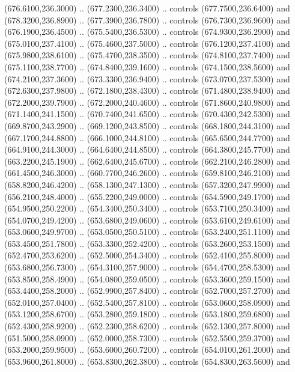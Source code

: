 {\begin{scope}[y=0.80pt, x=0.80pt, yscale=-1, xscale=1, inner sep=0pt, outer sep=0pt, #1]
      (676.6100,236.3000) .. (677.2300,236.3400) .. controls (677.7500,236.6400) and
      (678.3200,236.8900) .. (677.3900,236.7800) .. controls (676.7300,236.9600) and
      (676.1900,236.4500) .. (675.5400,236.5300) .. controls (674.9300,236.2900) and
      (675.0100,237.4100) .. (675.4600,237.5000) .. controls (676.1200,237.4100) and
      (675.9800,238.6100) .. (675.4700,238.3500) .. controls (674.8100,237.7400) and
      (675.1100,238.7700) .. (674.8400,239.1600) .. controls (674.1500,238.5600) and
      (674.2100,237.3600) .. (673.3300,236.9400) .. controls (673.0700,237.5300) and
      (672.6300,237.9800) .. (672.1800,238.4300) .. controls (671.4800,238.9400) and
      (672.2000,239.7900) .. (672.2000,240.4600) .. controls (671.8600,240.9800) and
      (671.1400,241.1500) .. (670.7400,241.6500) .. controls (670.4300,242.5300) and
      (669.8700,243.2900) .. (669.1200,243.8500) .. controls (668.1800,244.3100) and
      (667.1700,244.8800) .. (666.1000,244.8100) .. controls (665.6500,244.7700) and
      (664.9100,244.3000) .. (664.6400,244.8500) .. controls (664.3800,245.7700) and
      (663.2200,245.1900) .. (662.6400,245.6700) .. controls (662.2100,246.2800) and
      (661.4500,246.3000) .. (660.7700,246.2600) .. controls (659.8100,246.2100) and
      (658.8200,246.4200) .. (658.1300,247.1300) .. controls (657.3200,247.9900) and
      (656.2100,248.4000) .. (655.2200,249.0000) .. controls (654.5900,249.1700) and
      (654.9500,250.2200) .. (654.3400,250.3400) .. controls (653.7100,250.3400) and
      (654.0700,249.4200) .. (653.6800,249.0600) .. controls (653.6100,249.6100) and
      (653.0600,249.9700) .. (653.0500,250.5100) .. controls (653.2400,251.1100) and
      (653.4500,251.7800) .. (653.3300,252.4200) .. controls (653.2600,253.1500) and
      (652.4700,253.6200) .. (652.5000,254.3400) .. controls (652.4100,255.8000) and
      (653.6800,256.7300) .. (654.3100,257.9000) .. controls (654.4700,258.5300) and
      (653.8500,258.4900) .. (654.0800,259.0500) .. controls (653.3600,259.1500) and
      (653.4400,258.2000) .. (652.9900,257.8400) .. controls (652.7000,257.2700) and
      (652.0100,257.0400) .. (652.5400,257.8100) .. controls (653.0600,258.0900) and
      (653.1200,258.6700) .. (653.2800,259.1800) .. controls (653.1800,259.6800) and
      (652.4300,258.9200) .. (652.2300,258.6200) .. controls (652.1300,257.8000) and
      (651.5000,258.0900) .. (652.0000,258.7300) .. controls (652.5500,259.3700) and
      (653.2000,259.9500) .. (653.6000,260.7200) .. controls (654.0100,261.2000) and
      (653.9600,261.8000) .. (653.8300,262.3800) .. controls (654.8300,263.5600) and

\end{scope}}
